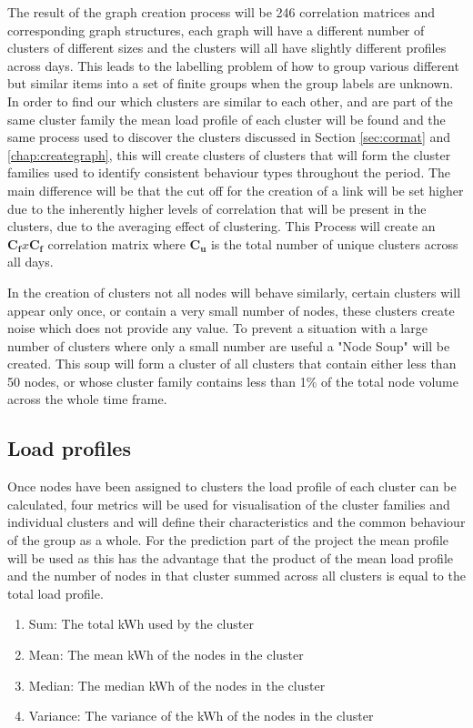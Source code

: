 The result of the graph creation process will be 246 correlation matrices and corresponding graph structures, each graph will have a different number of clusters of different sizes and the clusters will all have slightly different profiles across days. This leads to the labelling problem of how to group various different but similar items into a set of finite groups when the group labels are unknown. In order to find our which clusters are similar to each other, and are part of the same cluster family the mean load profile of each cluster will be found and the same process used to discover the clusters discussed in Section \ref{sec:cormat} and \ref{chap:creategraph}, this will create clusters of clusters that will form the cluster families used to identify consistent behaviour types throughout the period.  The main difference will be that the cut off for the creation of a link will be set higher due to the inherently higher levels of correlation that will be present in the clusters, due to the averaging effect of clustering. This Process will create an $\mathbf{C_f}x\mathbf{C_f}$ correlation matrix where $\mathbf{C_u}$ is the total number of unique clusters across all days. 

In the creation of clusters not all nodes will behave similarly, certain clusters will appear only once, or contain a very small number of nodes, these clusters create noise which does not provide any value. To prevent a situation with a large number of clusters where only a small number are useful a "Node Soup" will be created. This soup will form a cluster of all clusters that contain either less than 50 nodes, or whose cluster family contains less than 1\% of the total node volume across the whole time frame.


\subsection{Load profiles}
\label{sec:LoadProfiles}
Once nodes have been assigned to clusters the load profile of each cluster can be calculated, four metrics will be used for visualisation of the cluster families and individual clusters and will define their characteristics and the common behaviour of the group as a whole. For the prediction part of the project the mean profile will be used as this has the advantage that the product of the mean load profile and the number of nodes in that cluster summed across all clusters is equal to the total load profile.

\begin{enumerate}
\itemsep0em 
\item Sum: The total kWh used by the cluster
\item Mean: The mean kWh of the nodes in the cluster
\item Median: The median kWh of the nodes in the cluster
\item Variance: The variance of the kWh of the nodes in the cluster
\end{enumerate}

